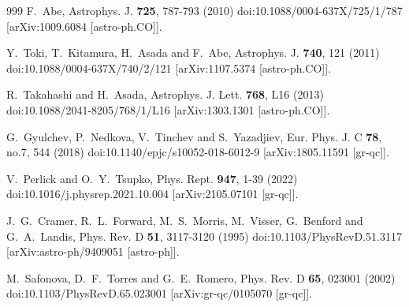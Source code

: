 \documentclass[aps,preprint,groupedaddress,nofootinbib,superscriptaddress,showkeys,showpacs,eqsecnum,amsmath,amssymb]{revtex4-1}
\begin{document}
\begin{thebibliography}{999}
F.~Abe,
Astrophys. J. \textbf{725}, 787-793 (2010)
doi:10.1088/0004-637X/725/1/787
[arXiv:1009.6084 [astro-ph.CO]].


Y.~Toki, T.~Kitamura, H.~Asada and F.~Abe,
Astrophys. J. \textbf{740}, 121 (2011)
doi:10.1088/0004-637X/740/2/121
[arXiv:1107.5374 [astro-ph.CO]].

R.~Takahashi and H.~Asada,
Astrophys. J. Lett. \textbf{768}, L16 (2013)
doi:10.1088/2041-8205/768/1/L16
[arXiv:1303.1301 [astro-ph.CO]].


G.~Gyulchev, P.~Nedkova, V.~Tinchev and S.~Yazadjiev,
Eur. Phys. J. C \textbf{78}, no.7, 544 (2018)
doi:10.1140/epjc/s10052-018-6012-9
[arXiv:1805.11591 [gr-qc]].



V.~Perlick and O.~Y.~Tsupko,
Phys. Rept. \textbf{947}, 1-39 (2022)
doi:10.1016/j.physrep.2021.10.004
[arXiv:2105.07101 [gr-qc]].






J.~G.~Cramer, R.~L.~Forward, M.~S.~Morris, M.~Visser, G.~Benford and G.~A.~Landis,
Phys. Rev. D \textbf{51}, 3117-3120 (1995)
doi:10.1103/PhysRevD.51.3117
[arXiv:astro-ph/9409051 [astro-ph]].

M.~Safonova, D.~F.~Torres and G.~E.~Romero,
Phys. Rev. D \textbf{65}, 023001 (2002)
doi:10.1103/PhysRevD.65.023001
[arXiv:gr-qc/0105070 [gr-qc]].


\end{thebibliography}
\end{document}
